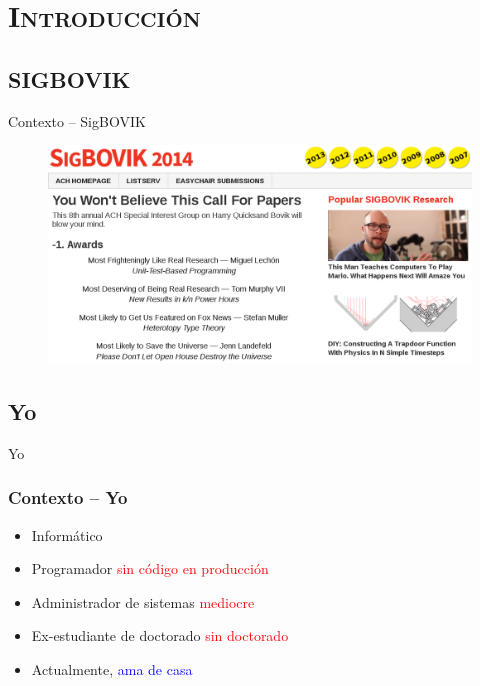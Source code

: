 \documentclass[xcolor=x11names,compress]{beamer}
\renewcommand{\(}{\begin{columns}}
\renewcommand{\)}{\end{columns}}
\newcommand{\<}[1]{\begin{column}{#1}}
\renewcommand{\>}{\end{column}}
\begin{document}
\section{\scshape Introducción}
\subsection{SIGBOVIK}
\begin{frame}{Contexto -- SigBOVIK}
    \begin{figure}[t]
        \centering
        \includegraphics[width=1.0\textwidth]{images/sigbovik.png}
    \end{figure}
\end{frame}

\subsection{Yo}
\begin{frame}{Yo}
    \frametitle{Contexto -- Yo}
    \begin{itemize}
        \item Informático \pause
        \item Programador \textcolor{red}{sin código en producción} \pause
        \item Administrador de sistemas \textcolor{red}{mediocre} \pause
        \item Ex-estudiante de doctorado \textcolor{red}{sin doctorado} \pause
        \item Actualmente, \textcolor{blue}{ama de casa}
    \end{itemize}
\end{frame}
\end{document}
